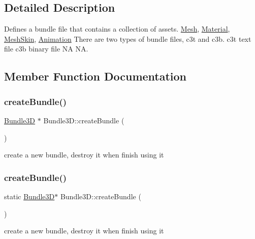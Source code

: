 \subsection{Detailed Description}
Defines a bundle file that contains a collection of assets. \hyperlink{classMesh}{Mesh}, \hyperlink{classMaterial}{Material}, \hyperlink{classMeshSkin}{Mesh\+Skin}, \hyperlink{classAnimation}{Animation} There are two types of bundle files, c3t and c3b. c3t text file c3b binary file  NA  NA. 

\subsection{Member Function Documentation}
\mbox{\label{classBundle3D_afeb39c466af4193d183ae1bac9cf97b9}} 
\subsubsection{\texorpdfstring{create\+Bundle()}{createBundle()}\hspace{0.1cm}{\footnotesize\ttfamily [1/2]}}
{\footnotesize\ttfamily \hyperlink{classBundle3D}{Bundle3D} $\ast$ Bundle3\+D\+::create\+Bundle (\begin{DoxyParamCaption}{ }\end{DoxyParamCaption})\hspace{0.3cm}{\ttfamily [static]}}

create a new bundle, destroy it when finish using it \mbox{\label{classBundle3D_a8b31b51ff4e3c3d39cb8e13c7dd07993}} 
\subsubsection{\texorpdfstring{create\+Bundle()}{createBundle()}\hspace{0.1cm}{\footnotesize\ttfamily [2/2]}}
{\footnotesize\ttfamily static \hyperlink{classBundle3D}{Bundle3D}$\ast$ Bundle3\+D\+::create\+Bundle (\begin{DoxyParamCaption}{ }\end{DoxyParamCaption})\hspace{0.3cm}{\ttfamily [static]}}

create a new bundle, destroy it when finish using it \mbox{\label{classBundle3D_ae97afafbab50ed831d26097e8c94b6bf}} 
